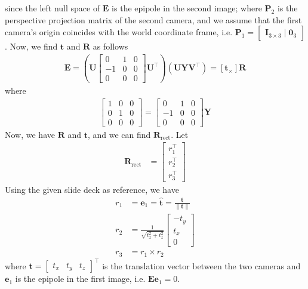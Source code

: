 \documentclass[10pt]{article}
\begin{document}
    since the left null space of $\mathbf{E}$ is the epipole in the second image;
    where $\mathbf{P}_{2}$ is the perspective projection matrix of the second
    camera, and we assume that the first camera's origin coincides with the world
    coordinate frame, i.e. $\mathbf{P}_{1} = \begin{bmatrix}
        \mathbf{I}_{3 \times 3} \mid \mathbf{0}_{3}
    \end{bmatrix}$. Now, we find $\mathbf{t}$ and $\mathbf{R}$ as follows
    \begin{align*}
        \mathbf{E} = \left( \mathbf{U} \begin{bmatrix}
            0 & 1 & 0 \\
            -1 & 0 & 0 \\
            0 & 0 & 0
        \end{bmatrix} \mathbf{U}^{\top} \right)
        \left( \mathbf{U} \mathbf{Y} \mathbf{V}^{\top} \right)
        = [\mathbf{t}_{\times}] \mathbf{R}
    \end{align*}
    where
    \begin{align*}
        \begin{bmatrix}
            1 & 0 & 0 \\
            0 & 1 & 0 \\
            0 & 0 & 0
        \end{bmatrix} = \begin{bmatrix}
            0 & 1 & 0 \\
            -1 & 0 & 0 \\
            0 & 0 & 0
        \end{bmatrix} \mathbf{Y}
    \end{align*}
    Now, we have $\mathbf{R}$ and $\mathbf{t}$, and we can find $\mathbf{R}_{\text{rect}}$. Let
    \begin{align*}
        \mathbf{R}_{\text{rect}} &= \begin{bmatrix}
            r_{1}^{\top} \\ r_{2}^{\top} \\ r_{3}^{\top}
        \end{bmatrix}
    \end{align*}
    Using the given slide deck as reference, we have
    \begin{align*}
        r_{1} &= \mathbf{e}_{1} = \mathbf{\hat{t}} = \frac{\mathbf{t}}{\lVert \mathbf{t} \rVert} \\
        r_{2} &= \frac{1}{\sqrt{t_{x}^{2} + t_{z}^{2}}} \begin{bmatrix}
            -t_{y} \\ t_{x} \\ 0
        \end{bmatrix} \\
        r_{3} &= r_{1} \times r_{2}
    \end{align*}
    where $\mathbf{t} = \begin{bmatrix} t_{x} & t_{y} & t_{z} \end{bmatrix}^{\top}$
    is the translation vector between the two cameras and $\mathbf{e}_{1}$ is the
    epipole in the first image, i.e. $\mathbf{E} \mathbf{e}_{1} = 0$.
\end{document}
